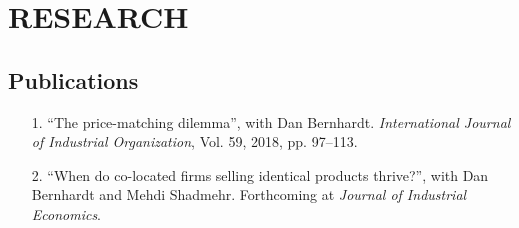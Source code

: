 \documentclass{article}
\begin{document}





\section{RESEARCH}
\subsection{Publications}
\begin{itemize}
    \item[1.] ``The price-matching dilemma'', with Dan Bernhardt. \emph{International Journal of Industrial Organization}, Vol. 59, 2018, pp. 97--113.
    \item[2.] ``When do co-located firms selling identical products thrive?'', with Dan Bernhardt and Mehdi Shadmehr. Forthcoming at \emph{Journal of Industrial Economics}.
\end{itemize}
\end{document}
